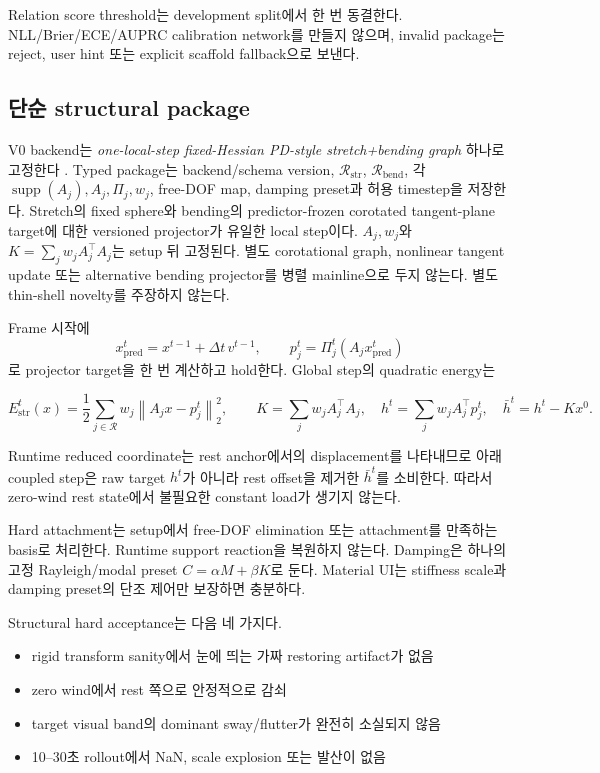 \documentclass[11pt]{article}
\begin{document}
Relation score threshold는 development split에서 한 번 동결한다.
NLL/Brier/ECE/AUPRC calibration network를 만들지 않으며,
invalid package는 reject, user hint 또는 explicit scaffold fallback으로 보낸다.

\subsection{단순 structural package}

V0 backend는 \emph{one-local-step fixed-Hessian PD-style stretch+bending graph} 하나로 고정한다
\cite{bouaziz2014projective}.
Typed package는 backend/schema version, \(\mathcal R_{\mathrm{str}}\),
\(\mathcal R_{\mathrm{bend}}\), 각 \(\operatorname{supp}(A_j),A_j,\Pi_j,w_j\),
free-DOF map, damping preset과 허용 timestep을 저장한다.
Stretch의 fixed sphere와 bending의 predictor-frozen corotated tangent-plane target에 대한
versioned projector가 유일한 local step이다. \(A_j,w_j\)와
\(K=\sum_jw_jA_j^\top A_j\)는 setup 뒤 고정된다.
별도 corotational graph, nonlinear tangent update 또는 alternative bending projector를
병렬 mainline으로 두지 않는다.
별도 thin-shell novelty를 주장하지 않는다.

Frame 시작에
\[
  x_{\mathrm{pred}}^t=x^{t-1}+\Delta t\,v^{t-1},\qquad
  p_j^t=\Pi_j^t(A_jx_{\mathrm{pred}}^t)
\]
로 projector target을 한 번 계산하고 hold한다.
Global step의 quadratic energy는

\begin{equation}
  E_{\mathrm{str}}^t(x)
  =
  \frac12\sum_{j\in\mathcal R}
  w_j\left\|A_jx-p_j^t\right\|_2^2,
  \qquad
  K=\sum_j w_jA_j^\top A_j,\quad
  h^t=\sum_j w_jA_j^\top p_j^t,\quad
  \bar h^t=h^t-Kx^0.
  \label{eq:minimal-structural-backend}
\end{equation}

Runtime reduced coordinate는 rest anchor에서의 displacement를 나타내므로
아래 coupled step은 raw target \(h^t\)가 아니라 rest offset을 제거한
\(\bar h^t\)를 소비한다. 따라서 zero-wind rest state에서 불필요한 constant load가 생기지 않는다.

Hard attachment는 setup에서 free-DOF elimination 또는 attachment를 만족하는 basis로 처리한다.
Runtime support reaction을 복원하지 않는다.
Damping은 하나의 고정 Rayleigh/modal preset
\(C=\alpha M+\beta K\)로 둔다. Material UI는 stiffness scale과 damping preset의
단조 제어만 보장하면 충분하다.

Structural hard acceptance는 다음 네 가지다.

\begin{itemize}
  \item rigid transform sanity에서 눈에 띄는 가짜 restoring artifact가 없음
  \item zero wind에서 rest 쪽으로 안정적으로 감쇠
  \item target visual band의 dominant sway/flutter가 완전히 소실되지 않음
  \item 10--30초 rollout에서 NaN, scale explosion 또는 발산이 없음
\end{itemize}
\end{document}
